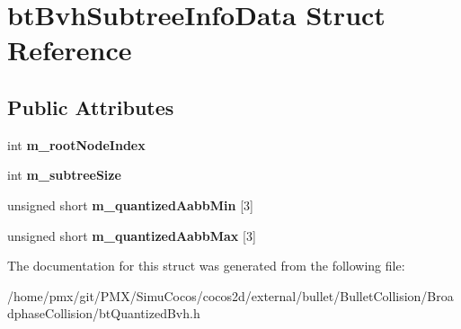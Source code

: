 \hypertarget{structbtBvhSubtreeInfoData}{}\section{bt\+Bvh\+Subtree\+Info\+Data Struct Reference}
\label{structbtBvhSubtreeInfoData}
\subsection*{Public Attributes}
\begin{DoxyCompactItemize}
\item 
\mbox{\label{structbtBvhSubtreeInfoData_aba9a231e428f528a1c28bb65d6b19362}} 
int {\bfseries m\+\_\+root\+Node\+Index}
\item 
\mbox{\label{structbtBvhSubtreeInfoData_a3192c8388d50c9183282bb0b8aca0e95}} 
int {\bfseries m\+\_\+subtree\+Size}
\item 
\mbox{\label{structbtBvhSubtreeInfoData_a3fabed2f5ca7eae2d3a2ca5fa84922f7}} 
unsigned short {\bfseries m\+\_\+quantized\+Aabb\+Min} \mbox{[}3\mbox{]}
\item 
\mbox{\label{structbtBvhSubtreeInfoData_a663fef3ea1ab94e6318a28269a58ff60}} 
unsigned short {\bfseries m\+\_\+quantized\+Aabb\+Max} \mbox{[}3\mbox{]}
\end{DoxyCompactItemize}


The documentation for this struct was generated from the following file\+:\begin{DoxyCompactItemize}
\item 
/home/pmx/git/\+P\+M\+X/\+Simu\+Cocos/cocos2d/external/bullet/\+Bullet\+Collision/\+Broadphase\+Collision/bt\+Quantized\+Bvh.\+h\end{DoxyCompactItemize}
